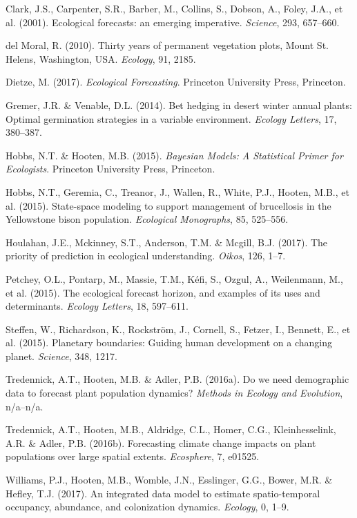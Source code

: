 \documentclass[12pt,]{article}
\begin{document}
\hypertarget{ref-Clark2001}{}
Clark, J.S., Carpenter, S.R., Barber, M., Collins, S., Dobson, A.,
Foley, J.A., et al. (2001). Ecological forecasts: an emerging
imperative. \emph{Science}, 293, 657--660.

\hypertarget{ref-DelMoral2010}{}
{del Moral}, R. (2010). Thirty years of permanent vegetation plots,
Mount St. Helens, Washington, USA. \emph{Ecology}, 91, 2185.

\hypertarget{ref-Dietze2017}{}
Dietze, M. (2017). \emph{Ecological Forecasting}. Princeton University
Press, Princeton.

\hypertarget{ref-Gremer2014}{}
Gremer, J.R. \& Venable, D.L. (2014). Bet hedging in desert winter
annual plants: Optimal germination strategies in a variable environment.
\emph{Ecology Letters}, 17, 380--387.

\hypertarget{ref-Hobbs2015}{}
Hobbs, N.T. \& Hooten, M.B. (2015). \emph{Bayesian Models: A Statistical
Primer for Ecologists}. Princeton University Press, Princeton.

\hypertarget{ref-Hobbs2015EcolMon}{}
Hobbs, N.T., Geremia, C., Treanor, J., Wallen, R., White, P.J., Hooten,
M.B., et al. (2015). State-space modeling to support management of
brucellosis in the Yellowstone bison population. \emph{Ecological
Monographs}, 85, 525--556.

\hypertarget{ref-Houlahan2017}{}
Houlahan, J.E., Mckinney, S.T., Anderson, T.M. \& Mcgill, B.J. (2017).
The priority of prediction in ecological understanding. \emph{Oikos},
126, 1--7.

\hypertarget{ref-Petchey2015}{}
Petchey, O.L., Pontarp, M., Massie, T.M., Kéfi, S., Ozgul, A.,
Weilenmann, M., et al. (2015). The ecological forecast horizon, and
examples of its uses and determinants. \emph{Ecology Letters}, 18,
597--611.

\hypertarget{ref-Steffen2015}{}
Steffen, W., Richardson, K., Rockström, J., Cornell, S., Fetzer, I.,
Bennett, E., et al. (2015). Planetary boundaries: Guiding human
development on a changing planet. \emph{Science}, 348, 1217.

\hypertarget{ref-Tredennick2016MEE}{}
Tredennick, A.T., Hooten, M.B. \& Adler, P.B. (2016a). Do we need
demographic data to forecast plant population dynamics? \emph{Methods in
Ecology and Evolution}, n/a--n/a.

\hypertarget{ref-Tredennick2016Ecos}{}
Tredennick, A.T., Hooten, M.B., Aldridge, C.L., Homer, C.G.,
Kleinhesselink, A.R. \& Adler, P.B. (2016b). Forecasting climate change
impacts on plant populations over large spatial extents.
\emph{Ecosphere}, 7, e01525.

\hypertarget{ref-Williams2017}{}
Williams, P.J., Hooten, M.B., Womble, J.N., Esslinger, G.G., Bower, M.R.
\& Hefley, T.J. (2017). An integrated data model to estimate
spatio-temporal occupancy, abundance, and colonization dynamics.
\emph{Ecology}, 0, 1--9.
\end{document}
